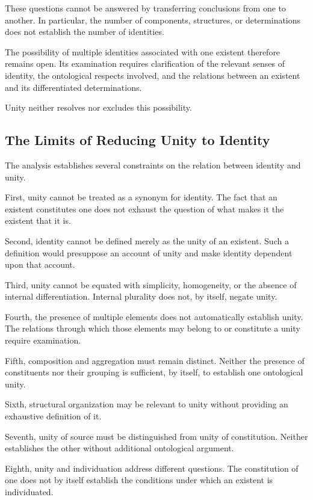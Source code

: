 These questions cannot be answered
by transferring conclusions from
one to another. In particular, the
number of components, structures,
or determinations does not establish
the number of identities.

The possibility of multiple identities
associated with one existent therefore
remains open. Its examination requires
clarification of the relevant senses
of identity, the ontological respects
involved, and the relations between
an existent and its differentiated
determinations.

Unity neither resolves nor excludes
this possibility.

\subsection{The Limits of Reducing Unity to Identity}

The analysis establishes several
constraints on the relation between
identity and unity.

First, unity cannot be treated as
a synonym for identity. The fact
that an existent constitutes one
does not exhaust the question of
what makes it the existent that
it is.

Second, identity cannot be defined
merely as the unity of an existent.
Such a definition would presuppose
an account of unity and make identity
dependent upon that account.

Third, unity cannot be equated with
simplicity, homogeneity, or the
absence of internal differentiation.
Internal plurality does not, by
itself, negate unity.

Fourth, the presence of multiple
elements does not automatically
establish unity. The relations
through which those elements may
belong to or constitute a unity
require examination.

Fifth, composition and aggregation
must remain distinct. Neither the
presence of constituents nor their
grouping is sufficient, by itself,
to establish one ontological unity.

Sixth, structural organization may
be relevant to unity without
providing an exhaustive definition
of it.

Seventh, unity of source must be
distinguished from unity of
constitution. Neither establishes
the other without additional
ontological argument.

Eighth, unity and individuation
address different questions.
The constitution of one does not
by itself establish the conditions
under which an existent is
individuated.

